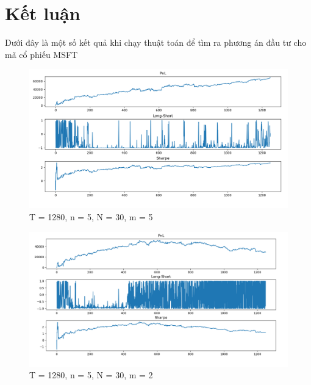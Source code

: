 \documentclass[14pt]{extreport}
\begin{document}
\chapter{Kết luận}
Dưới đây là một số kết quả khi chạy thuật toán để tìm ra phương án đầu tư cho mã cổ phiếu MSFT

\begin{center}
    \begin{figure}[htp]
    \begin{center}
     \includegraphics[scale=.5]{result_1}
    \end{center}
    \caption{T = 1280, n = 5, N = 30, m = 5}
    \end{figure}
\end{center}

\begin{center}
    \begin{figure}[htp]
    \begin{center}
     \includegraphics[scale=.5]{result_2}
    \end{center}
    \caption{T = 1280, n = 5, N = 30, m = 2}
    \end{figure}
\end{center}
\end{document}
